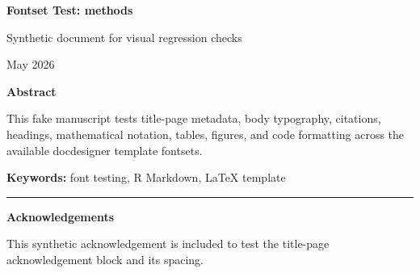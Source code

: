 \documentclass[12pt]{article}
\newif\ifdocdesigneranon
\begin{document}
\begin{titlepage}
\thispagestyle{empty}

\vspace*{0.14\textheight}
\begin{center}


{\LARGE\bfseries Fontset Test: methods\par}

\vspace{0.25em}
{\large Synthetic document for visual regression checks\par}

\vspace{2em}

\begin{singlespace}
{\normalsize

\docdesignerauthorblock

\par\vspace{2\baselineskip}
\docdesignerseriesblock

\ifdocdesigneranon\else
\vspace{0.5em}
{\small May 2026}\par
\fi

}
\end{singlespace}


\vspace{2em}

\begin{minipage}{0.8\textwidth}
\small\singlespacing
\textbf{Abstract}\par\vspace{0.25em}
This fake manuscript tests title-page metadata, body typography,
citations, headings, mathematical notation, tables, figures, and code
formatting across the available docdesigner template fontsets.
\par\vspace{1em}
\noindent\textbf{Keywords: }font testing, R Markdown, LaTeX template
\end{minipage}

\vfill

\ifdocdesigneranon\else
\begin{minipage}{0.8\textwidth}
\footnotesize\singlespacing
\noindent\rule{0.3\textwidth}{0.4pt}\par
\textbf{Acknowledgements}\par
This synthetic acknowledgement is included to test the title-page
acknowledgement block and its spacing.
\end{minipage}
\fi

\end{center}
\end{titlepage}
\fi\fi
\fi\fi
\end{document}
